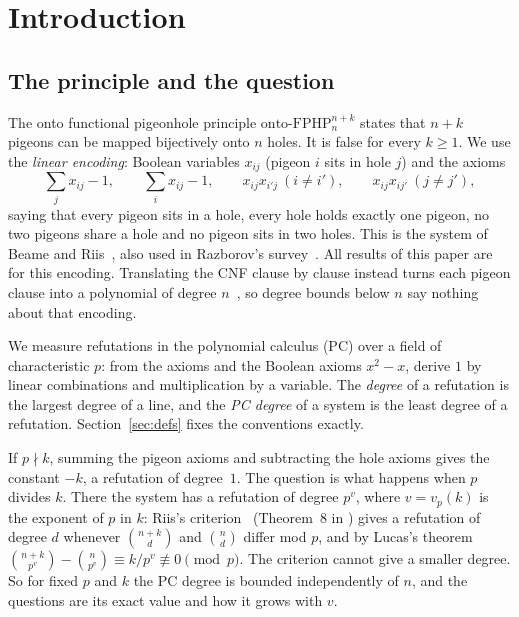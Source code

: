 
\section{Introduction}\label{sec:intro}

\subsection{The principle and the question}\label{sec:intro-question}

The onto functional pigeonhole principle $\mathrm{onto\text{-}FPHP}^{n+k}_n$ states that
$n+k$ pigeons can be mapped bijectively onto $n$ holes.  It is false for every $k\ge1$.
We use the \emph{linear encoding}: Boolean variables $x_{ij}$ (pigeon $i$ sits in hole $j$)
and the axioms
\[
  \textstyle\sum_{j}x_{ij}-1,\qquad \sum_{i}x_{ij}-1,\qquad x_{ij}x_{i'j}\ (i\ne i'),\qquad x_{ij}x_{ij'}\ (j\ne j'),
\]
saying that every pigeon sits in a hole, every hole holds exactly one pigeon, no two
pigeons share a hole and no pigeon sits in two holes.  This is the system of Beame and
Riis~\cite[Def.~7.2]{beame1998counting}, also used in Razborov's
survey~\cite{razborov2001php}.  All results of this paper are for this encoding.
Translating the CNF clause by clause instead turns each pigeon clause into a polynomial of
degree $n$~\cite[footnote~5]{razborov2001php}, so degree bounds below $n$ say nothing about
that encoding.

We measure refutations in the polynomial calculus (PC) over a field of characteristic
$p$: from the axioms and the Boolean axioms $x^2-x$, derive $1$ by linear combinations and
multiplication by a variable.  The \emph{degree} of a refutation is the largest degree of
a line, and the \emph{PC degree} of a system is the least degree of a refutation.
Section~\ref{sec:defs} fixes the conventions exactly.

If $p\nmid k$, summing the pigeon axioms and subtracting the hole axioms gives the constant
$-k$, a refutation of degree~$1$.  The question is what happens when $p$ divides $k$.
There the system has a refutation of degree $p^{v}$, where $v=v_p(k)$ is the exponent of
$p$ in $k$: Riis's criterion~\cite{riis1993independence} (Theorem~8 in
\cite{razborov2001php}) gives a refutation of degree $d$ whenever $\binom{n+k}{d}$ and
$\binom nd$ differ mod $p$, and by Lucas's theorem
$\binom{n+k}{p^v}-\binom{n}{p^v}\equiv k/p^v\not\equiv0\pmod p$.  The criterion cannot give
a smaller degree.  So for fixed $p$ and $k$ the PC degree is bounded independently of $n$,
and the questions are its exact value and how it grows with $v$.

